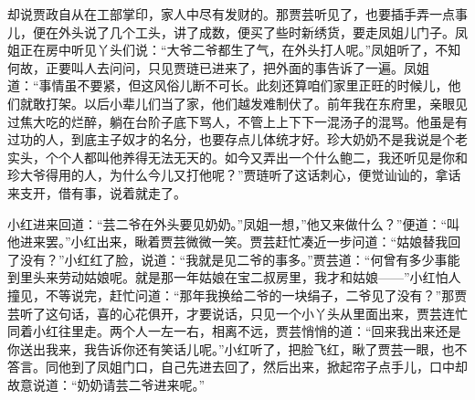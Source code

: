 \begin{parag}
    却说贾政自从在工部掌印，家人中尽有发财的。那贾芸听见了，也要插手弄一点事儿，便在外头说了几个工头，讲了成数，便买了些时新绣货，要走凤姐儿门子。凤姐正在房中听见丫头们说：“大爷二爷都生了气，在外头打人呢。”凤姐听了，不知何故，正要叫人去问问，只见贾琏已进来了，把外面的事告诉了一遍。凤姐道：“事情虽不要紧，但这风俗儿断不可长。此刻还算咱们家里正旺的时候儿，他们就敢打架。以后小辈儿们当了家，他们越发难制伏了。前年我在东府里，亲眼见过焦大吃的烂醉，躺在台阶子底下骂人，不管上上下下一混汤子的混骂。他虽是有过功的人，到底主子奴才的名分，也要存点儿体统才好。珍大奶奶不是我说是个老实头，个个人都叫他养得无法无天的。如今又弄出一个什么鲍二，我还听见是你和珍大爷得用的人，为什么今儿又打他呢？”贾琏听了这话刺心，便觉讪讪的，拿话来支开，借有事，说着就走了。
\end{parag}


\begin{parag}
    小红进来回道：“芸二爷在外头要见奶奶。”凤姐一想，”他又来做什么？”便道：“叫他进来罢。”小红出来，瞅着贾芸微微一笑。贾芸赶忙凑近一步问道：“姑娘替我回了没有？”小红红了脸，说道：“我就是见二爷的事多。”贾芸道：“何曾有多少事能到里头来劳动姑娘呢。就是那一年姑娘在宝二叔房里，我才和姑娘——”小红怕人撞见，不等说完，赶忙问道：“那年我换给二爷的一块绢子，二爷见了没有？”那贾芸听了这句话，喜的心花俱开，才要说话，只见一个小丫头从里面出来，贾芸连忙同着小红往里走。两个人一左一右，相离不远，贾芸悄悄的道：“回来我出来还是你送出我来，我告诉你还有笑话儿呢。”小红听了，把脸飞红，瞅了贾芸一眼，也不答言。同他到了凤姐门口，自己先进去回了，然后出来，掀起帘子点手儿，口中却故意说道：“奶奶请芸二爷进来呢。”
\end{parag}



